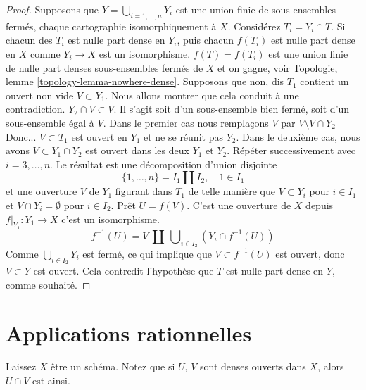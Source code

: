 \begin{proof}
Supposons que $Y = \bigcup_{i = 1, \ldots, n} Y_i$ est une union finie de sous-ensembles fermés, chaque cartographie isomorphiquement à $X$. Considérez
$T_i = Y_i \cap T$. Si chacun des $T_i$ est nulle part dense en $Y_i$, puis chacun $f(T_i)$ est nulle part dense en $X$ comme $Y_i \to X$ est un isomorphisme. $f(T) = f(T_i)$ est une union finie de nulle part denses sous-ensembles fermés de $X$ et on gagne, voir Topologie, lemme \ref{topology-lemma-nowhere-dense}. Supposons que non, dis $T_1$ contient un ouvert non vide $V \subset Y_1$. Nous allons montrer que cela conduit à une contradiction. $Y_2 \cap V \subset V$. Il s'agit soit d'un sous-ensemble bien fermé, soit d'un sous-ensemble égal à $V$. Dans le premier cas nous remplaçons
$V$ par $V \setminus V \cap Y_2$Donc... $V \subset T_1$ est ouvert en $Y_1$ et ne se réunit pas $Y_2$. Dans le deuxième cas, nous avons
$V \subset Y_1 \cap Y_2$ est ouvert dans les deux $Y_1$ et $Y_2$. Répéter successivement avec $i = 3, \ldots, n$. Le résultat est une décomposition d'union disjointe
$$
\{1, \ldots, n\} = I_1 \amalg I_2, \quad 1 \in I_1
$$
et une ouverture $V$ de $Y_1$ figurant dans $T_1$ de telle manière que $V \subset Y_i$
pour $i \in I_1$ et $V \cap Y_i = \emptyset$ pour $i \in I_2$. Prêt
$U = f(V)$. C'est une ouverture de $X$ depuis $f|_{Y_1} : Y_1 \to X$ c'est un isomorphisme.
$$
f^{-1}(U) = V\ \amalg\ \bigcup\nolimits_{i \in I_2} (Y_i \cap f^{-1}(U))
$$
Comme $\bigcup_{i \in I_2} Y_i$ est fermé, ce qui implique que
$V \subset f^{-1}(U)$ est ouvert, donc $V \subset Y$ est ouvert. Cela contredit l'hypothèse que $T$ est nulle part dense en $Y$, comme souhaité.

\end{proof}







\section{Applications rationnelles}
\label{section-rational-maps}

\noindent
Laissez $X$ être un schéma. Notez que si $U$, $V$ sont denses ouverts dans $X$, alors $U \cap V$ est ainsi.

